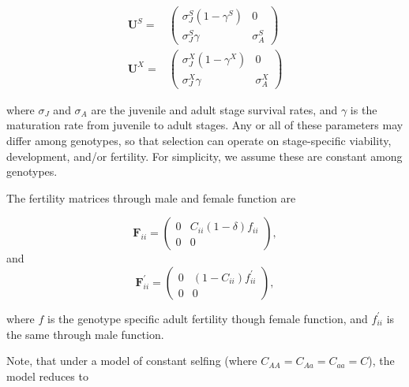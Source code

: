 \documentclass[11pt]{article}
\def\mbf#1{\mathbf{#1}}
\begin{document}
\begin{align*}
	\mbf{U}^S = &\left(
					\begin{array}{cc}
						\sigma^S_J(1 - \gamma^S) & 0 \\
						\sigma^S_J \gamma      & \sigma^S_A
					\end{array}
				\right) \\
	\mbf{U}^X = &\left(
					\begin{array}{cc}
						\sigma^X_J(1 - \gamma^X) & 0 \\
						\sigma^X_J \gamma      & \sigma^X_A
					\end{array}
				\right)
\end{align*}

\noindent where $\sigma_J$ and $\sigma_A$ are the juvenile and adult stage survival rates, and $\gamma$ is the maturation rate from juvenile to adult stages. Any or all of these parameters may differ among genotypes, so that selection can operate on stage-specific viability, development, and/or fertility. For simplicity, we assume these are constant among genotypes. 

The fertility matrices through male and female function are

\begin{equation}
	\mbf{F}_{ii} = \left(
					\begin{array}{cc}
						0 & C_{ii}(1 - \delta) f_{ii} \\
						0 & 0
					\end{array}
				\right),
\end{equation}
\noindent and
\begin{equation}
	\mbf{F}^{\prime}_{ii} = \left(
					\begin{array}{cc}
						0 & (1 - C_{ii}) f^{\prime}_{ii} \\
						0 & 0
					\end{array}
				\right),
\end{equation}

\noindent where $f$ is the genotype specific adult fertility though female function, and $f^{\prime}_{ii}$ is the same through male function. 

Note, that under a model of constant selfing (where $C_{AA} = C_{Aa} = C_{aa} = C$), the model reduces to
\end{document}
